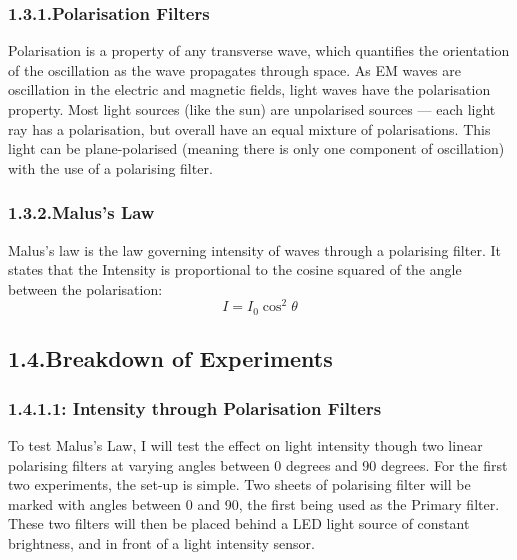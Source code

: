 \documentclass{article}
\begin{document}
\subsubsection{1.3.1.\hspace*{0.5em}Polarisation Filters}\label{sec-polarisation-filters}%

\noindent{}Polarisation is a property of any transverse wave, which quantifies the orientation of the oscillation as the wave propagates through space. As EM waves are oscillation in the electric and magnetic fields, light waves have the polarisation property. Most light sources (like the sun) are unpolarised sources — each light ray has a polarisation, but overall have an equal mixture of polarisations. This light can be plane-polarised (meaning there is only one component of oscillation) with the use of a polarising filter.%

\subsubsection{1.3.2.\hspace*{0.5em}Malus’s Law}\label{sec-maluss-law}%

\noindent{}Malus's law is the law governing intensity of waves through a polarising filter. It states that the Intensity is proportional to the cosine squared of the angle between the polarisation:%
\label{}%
\noindent{}
\noindent\[%
I=I_0\cos^2\theta
\]%

\subsection{1.4.\hspace*{0.5em}Breakdown of Experiments}\label{sec-breakdown-of-experiments}%

\subsubsection{1.4.1.\hspace*{0.5em}1: Intensity through Polarisation Filters}\label{sec-1--intensity-through-polarisation-filters}%

\noindent{}To test Malus's Law, I will test the effect on light intensity though two linear polarising filters at varying angles between 0 degrees and 90 degrees. For the first two experiments, the set-up is simple. Two sheets of polarising filter will be marked with angles between 0 and 90, the first being used as the Primary filter. These two filters will then be placed behind a LED light source of constant brightness, and in front of a light intensity sensor.%
\end{document}
